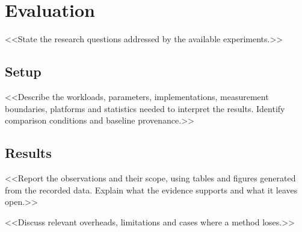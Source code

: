 \section{Evaluation}\label{sec:eval}
<<State the research questions addressed by the available experiments.>>

\subsection{Setup}\label{sec:eval:setup}
<<Describe the workloads, parameters, implementations, measurement boundaries,
platforms and statistics needed to interpret the results. Identify comparison
conditions and baseline provenance.>>

\subsection{Results}\label{sec:eval:results}
<<Report the observations and their scope, using tables and figures generated
from the recorded data. Explain what the evidence supports and what it leaves open.>>

<<Discuss relevant overheads, limitations and cases where a method loses.>>
